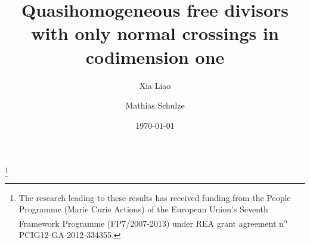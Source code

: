 

\usepackage[english]{babel}
\usepackage{amssymb,amsfonts,amsxtra,amsmath}
\usepackage{dsfont,mathrsfs}
\usepackage{tikz}

\usepackage[all]{xypic}
\usepackage{url}
\usepackage{stmaryrd}
\usepackage[colorlinks,plainpages,backref]{hyperref}
\usepackage[neveradjust]{paralist}

\theoremstyle{definition}
\newtheorem{ntn}{Notation}
\newtheorem{dfn}[ntn]{Definition}
\theoremstyle{plain}
\newtheorem{lem}[ntn]{Lemma}
\newtheorem{prp}[ntn]{Proposition}
\newtheorem{thm}[ntn]{Theorem}
\newtheorem{cor}[ntn]{Corollary}
\newtheorem{cnj}[ntn]{Conjecture}
\newtheorem{alg}[ntn]{Algorithm}
\theoremstyle{remark}
\newtheorem{cst}[ntn]{Construction}
\newtheorem{exa}[ntn]{Example}
\newtheorem{que}[ntn]{Question}
\newtheorem{rmk}[ntn]{Remark}




\title[Free divisors with only normal crossings]{Quasihomogeneous free divisors with only normal crossings in codimension one}

\author[X.~Liao]{Xia Liao}
\address{X.~Liao\\
Department of Mathematics\\
University of Kaiserslautern\\
67663 Kaiserslautern\\
Germany}

\author[M.~Schulze]{Mathias Schulze}
\address{M.~Schulze\\
Department of Mathematics\\
University of Kaiserslautern\\
67663 Kaiserslautern\\
Germany}

\thanks{The research leading to these results has received funding from the People Programme (Marie Curie Actions) of the European Union's Seventh Framework Programme (FP7/2007-2013) under REA grant agreement n\textsuperscript{o} PCIG12-GA-2012-334355.}

\date{\today}


